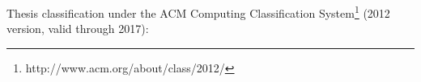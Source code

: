 \begin{acm}
    Thesis classification under the ACM Computing Classification System\footnote{http://www.acm.org/about/class/2012/} (2012 version, valid through 2017):
\end{acm}


